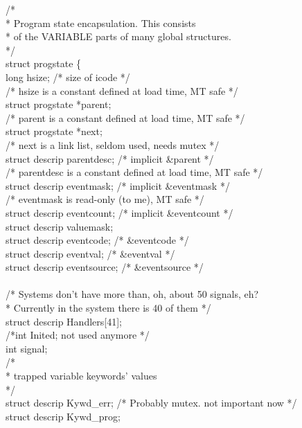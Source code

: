 \begin{iconcode}
/* \\
 * Program state encapsulation.  This consists \\
 * of the VARIABLE parts of many global structures. \\
 */ \\
struct progstate \{ \\
   long hsize;				/* size of icode */ \\
	/* hsize is a constant defined at load time, MT safe */ \\
   struct progstate *parent; \\
	/* parent is a constant defined at load time, MT safe */ \\
   struct progstate *next; \\
	/* next is a link list, seldom used, needs mutex */ \\
   struct descrip parentdesc;		/* implicit \&parent */ \\
	/* parentdesc is a constant defined at load time, MT safe */ \\
   struct descrip eventmask;		/* implicit \&eventmask */ \\
	/* eventmask is read-only (to me), MT safe */ \\
   struct descrip eventcount;		/* implicit \&eventcount */ \\
   struct descrip valuemask; \\
   struct descrip eventcode;		/* \&eventcode */ \\
   struct descrip eventval;		/* \&eventval */ \\
   struct descrip eventsource;		/* \&eventsource */ \\
\ \\
   /* Systems don't have more than, oh, about 50 signals, eh? \\
    * Currently in the system there is 40 of them            */ \\
   struct descrip Handlers[41]; \\
   /*int Inited; not used anymore */ \\
   int signal; \\
   /* \\
    * trapped variable keywords' values \\
    */ \\
   struct descrip Kywd\_err;          /* Probably mutex. not important now */ \\
   struct descrip Kywd\_prog; \\

\end{iconcode}
